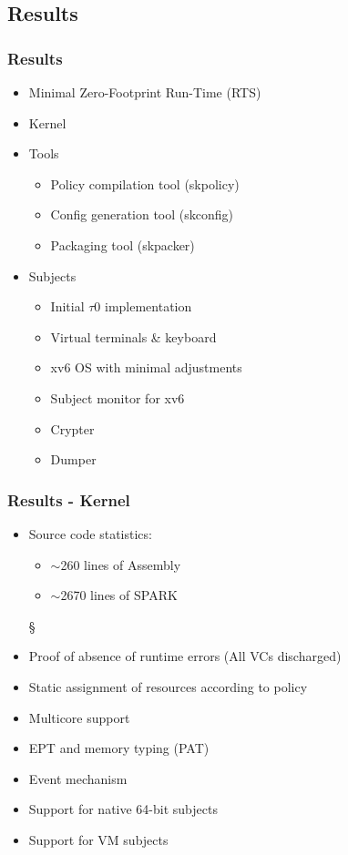 \documentclass[xcolor={dvipsnames}]{beamer}
\begin{document}
\subsection{Results}
\begin{frame}\frametitle{Results}
\begin{itemize}
	\item Minimal Zero-Footprint Run-Time (RTS)
	\item Kernel
	\item Tools
	\begin{itemize}
		\item Policy compilation tool (skpolicy)
		\item Config generation tool (skconfig)
		\item Packaging tool (skpacker)
	\end{itemize}
	\item Subjects
	\begin{itemize}
		\item Initial $\tau$0 implementation
		\item Virtual terminals \& keyboard
		\item xv6 OS with minimal adjustments
		\item Subject monitor for xv6
		\item Crypter
		\item Dumper
	\end{itemize}
\end{itemize}
\end{frame}

\begin{frame}\frametitle{Results - Kernel}
\begin{itemize}
	\item Source code statistics:
	\begin{itemize}
		\item $\sim$260 lines of Assembly
		\item $\sim$2670 lines of SPARK
	\end{itemize}§
	\item Proof of absence of runtime errors (All VCs discharged)
	\item Static assignment of resources according to policy
	\item Multicore support
	\item EPT and memory typing (PAT)
	\item Event mechanism
	\item Support for native 64-bit subjects
	\item Support for VM subjects
\end{itemize}
\end{frame}
\end{document}
